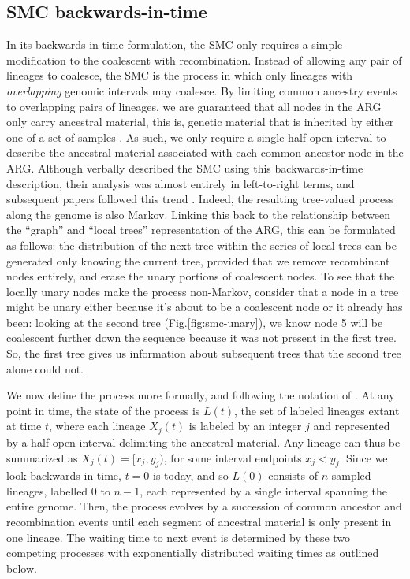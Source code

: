 \documentclass{article}
\begin{document}
\subsection{SMC backwards-in-time}\label{par:description}

In its backwards-in-time formulation, the SMC \citep{mcvean_approximating_2005} only requires a
simple modification to the coalescent with recombination.
Instead of allowing any pair of lineages to coalesce,
the SMC is the process in which only lineages with \emph{overlapping} genomic intervals may coalesce.
By limiting common ancestry events to overlapping pairs of lineages, we are
guaranteed that all nodes in the ARG only carry ancestral material, this is,
genetic material that is inherited by either one of a set of samples \citep{wiuf_ancestry_1999}.
As such, we only require a single half-open interval to describe the ancestral
material associated with each common ancestor node in the ARG.
Although \citet{mcvean_approximating_2005} verbally described the SMC
using this backwards-in-time description, their analysis
was almost entirely in left-to-right terms,
and subsequent papers followed this trend
\citep{li_inference_2011,paul_accurate_2011,schiffels_inferring_2014,rasmussen_genome-wide_2014}.
Indeed, the resulting tree-valued process along the genome is also Markov.
Linking this back to the relationship between the ``graph'' and
``local trees'' representation of
the ARG, this can be formulated as follows: the distribution of the
next tree within the series
of local trees can be generated only knowing the current tree,
provided that we remove recombinant nodes entirely,
and erase the unary portions of coalescent nodes.
To see that the locally unary nodes make the process non-Markov,
consider that a node in a tree might be unary either because
it's about to be a coalescent node or it already has been:
looking at the second tree (Fig.\ref{fig:smc-unary}),
we know node 5 will be coalescent further down the sequence
because it was not present in the first tree.
So, the first tree gives us information about subsequent trees
that the second tree alone could not.

We now define the process more formally,
and following the notation of \citet{mcvean_approximating_2005}.
At any point in time, the state of the process is $L(t)$,
the set of labeled lineages extant at time $t$,
where each lineage $X_j(t)$ is labeled by an integer $j$
and represented by a half-open interval delimiting the
ancestral material. Any lineage can thus be summarized as $X_j(t) = [x_{j}, y_{j})$,
for some interval endpoints $x_{j} < y_{j}$.
Since we look backwards in time, $t=0$ is today, and so
$L(0)$ consists of $n$ sampled lineages, labelled $0$ to $n-1$,
each represented by a single interval spanning the entire genome.
Then, the process evolves by a succession of common ancestor and recombination
events until each segment of ancestral material is only present in one lineage.
The waiting time to next event is determined by these two competing processes
with exponentially distributed waiting times as outlined below.
\end{document}
